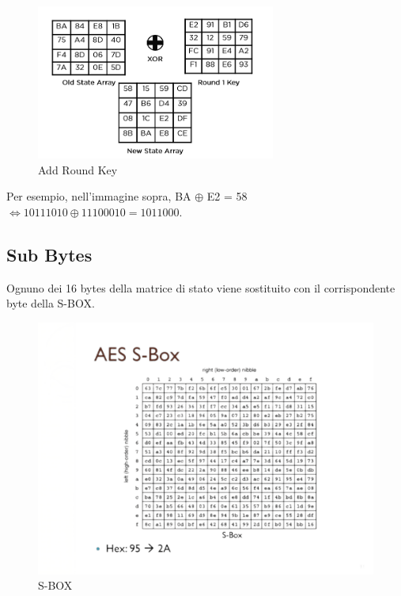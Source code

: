 \begin{figure}[H]
	\centering
	\includegraphics[width=0.7\textwidth, height=0.7\textheight, keepaspectratio]{./images/aes/add_round_key.png} 
	\caption{Add Round Key}
	\label{fig:add_round_key2}
\end{figure}


\textsf{\small Per esempio, nell'immagine sopra, BA $ \oplus $ E2 = 58 $ \Leftrightarrow 10111010 \oplus 11100010 = 1011000 $.}

\subsection{Sub Bytes}


\textsf{\small Ognuno dei 16 bytes della matrice di stato viene sostituito con il corrispondente byte della S-BOX.}

\begin{figure}[H]
	\centering
	\includegraphics[width=.9\textwidth, height=.9\textheight, keepaspectratio]{./images/aes/aes-s-box-no-background.png}
	\caption{S-BOX}
	\label{fig:sbox}
\end{figure}

